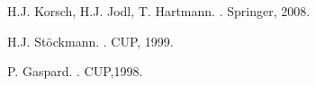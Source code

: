 \documentclass{article}
\begin{document}
  \begin{thebibliography}{9}    
  
     H.J. Korsch, H.J. Jodl, T. Hartmann.
     .
     \newblock Springer, 2008.
 
     H.J. St\"{o}ckmann.
     .
     \newblock CUP, 1999.
 
     P. Gaspard.
     .
     \newblock CUP,1998.
 
 \end{thebibliography}
 
\end{document}
